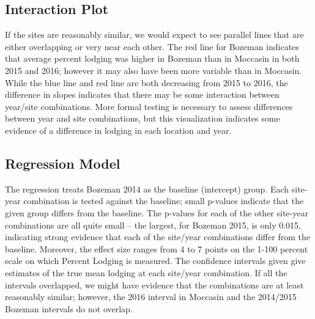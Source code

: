 \documentclass[11pt]{article}
\begin{document}
\begin{knitrout}\footnotesize
{}\color{fgcolor}\begin{kframe}


{\ttfamily\noindent\bfseries\color{errorcolor}{Error in var(bz16\$X..Lodging.boze.2016, na.rm = TRUE): 'x' is NULL}}

{\ttfamily\noindent\bfseries{}}\end{kframe}
\end{knitrout}


\subsection{Interaction Plot}
If the sites are reasonably similar, we would expect to see parallel lines that are either overlapping or very near each other.  The red line for Bozeman indicates that average percent lodging was higher in Bozeman than in Moccasin in both 2015 and 2016; however it may also have been more variable than in Moccasin. While the blue line and red line are both decreasing from 2015 to 2016, the difference in slopes indicates that there may be some interaction between year/site combinations.  More formal testing is necessary to assess differences between year and site combinations, but this visualization indicates some evidence of a difference in lodging in each location and year.



\subsection{Regression Model}
  The regression treats Bozeman 2014 as the baseline (intercept) group. Each site-year combination is tested against the   baseline; small p-values indicate that the given group differs from the baseline. The p-values for each of the other site-year combinations are all quite small – the largest, for Bozeman 2015, is only 0.015, indicating strong evidence that each of the site/year combinations differ from the baseline. Moreover, the effect size ranges from 4 to 7 points on the 1-100 percent scale on which Percent Lodging is measured.  The confidence intervals given give estimates of the true mean lodging at each site/year combination. If all the intervals overlapped, we might have evidence that the combinations are at least reasonably similar; however, the 2016 interval in Moccasin and the 2014/2015 Bozeman intervals do not overlap. 
\end{document}
